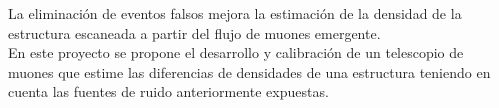 La eliminación de eventos falsos mejora la estimación de la densidad de la estructura escaneada a partir del flujo de muones emergente.\\

En este proyecto se propone el desarrollo y calibración de un telescopio de muones que estime las diferencias de densidades de una estructura teniendo en cuenta las fuentes de ruido anteriormente expuestas.





















